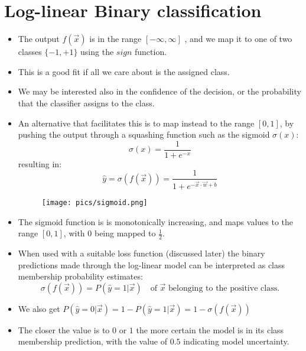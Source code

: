 \section{Log-linear Binary classification}
\begin{itemize}
\item The output $f(\vec{x})$ is in the range $[-\infty,\infty]$ , and we map it to one of two classes $\{-1,+1\}$ using the $sign$ function.
\item This is a good fit if all we care about is the assigned class.
\item We may be interested also in the confidence of the decision, or the probability that the classifier assigns to the class.
\item An alternative that facilitates this is to map instead to the range $[0,1]$, by pushing the output through a squashing function such as the sigmoid $\sigma(x)$:
\begin{equation}
\sigma(x) = \frac{1}{1+e^{-x}}  
\end{equation}
resulting in: 
\begin{equation}
\hat{y}=\sigma(f(\vec{x})) = \frac{1}{1+e^{-\vec{x}\cdot \vec{w}+b}}  
\end{equation}
\begin{figure}[htb]
	\centering
	 \texttt{[image: pics/sigmoid.png]}
\end{figure}
\item The sigmoid function is is monotonically increasing, and maps values
to the range $[0, 1]$, with $0$ being mapped to $\frac{1}{2}$.
\item When used with a suitable loss function (discussed later) the binary predictions made through the log-linear model can be interpreted as class membership probability estimates:
\begin{equation}
 \sigma(f(\vec{x})) = P(\hat{y} = 1| \vec{x}) \quad \text{of $\vec{x}$ belonging to the positive class.}
\end{equation}
\item We also get $P(\hat{y} = 0| \vec{x}) = 1 - P(\hat{y} = 1| \vec{x}) = 1 -  \sigma(f(\vec{x}))$
\item The closer the value is to $0$ or $1$ the more certain the model is in its class membership prediction, with the value of $0.5$ indicating model uncertainty.
\end{itemize}




